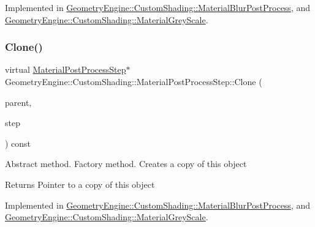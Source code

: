 Implemented in \mbox{\hyperlink{class_geometry_engine_1_1_custom_shading_1_1_material_blur_post_process_a5a6c1101b5ea4b96601db86ea36059de}{Geometry\+Engine\+::\+Custom\+Shading\+::\+Material\+Blur\+Post\+Process}}, and \mbox{\hyperlink{class_geometry_engine_1_1_custom_shading_1_1_material_grey_scale_a1b3bf70a4e714e7c456203f2dee1ffec}{Geometry\+Engine\+::\+Custom\+Shading\+::\+Material\+Grey\+Scale}}.

\mbox{\label{class_geometry_engine_1_1_custom_shading_1_1_material_post_process_step_a5fd4c17faac4fea71831868027d5a516}} 
\subsubsection{\texorpdfstring{Clone()}{Clone()}}
{\footnotesize\ttfamily virtual \mbox{\hyperlink{class_geometry_engine_1_1_custom_shading_1_1_material_post_process_step}{Material\+Post\+Process\+Step}}$\ast$ Geometry\+Engine\+::\+Custom\+Shading\+::\+Material\+Post\+Process\+Step\+::\+Clone (\begin{DoxyParamCaption}\item[{\mbox{\hyperlink{class_geometry_engine_1_1_custom_shading_1_1_material_post_process_interface}{Material\+Post\+Process\+Interface}} $\ast$}]{parent,  }\item[{\mbox{\hyperlink{namespace_geometry_engine_1_1_custom_shading_af8b09b91ca7086f4f67a5d4181f35e58}{Material\+Post\+Process\+Steps}}}]{step }\end{DoxyParamCaption}) const\hspace{0.3cm}{\ttfamily [pure virtual]}}

Abstract method. Factory method. Creates a copy of this object \begin{DoxyReturn}{Returns}
Pointer to a copy of this object 
\end{DoxyReturn}


Implemented in \mbox{\hyperlink{class_geometry_engine_1_1_custom_shading_1_1_material_blur_post_process_ac0e7b317fc9e8e8da8f66eb295adad87}{Geometry\+Engine\+::\+Custom\+Shading\+::\+Material\+Blur\+Post\+Process}}, and \mbox{\hyperlink{class_geometry_engine_1_1_custom_shading_1_1_material_grey_scale_a41197b3565f2098a3b713b5de572f2ed}{Geometry\+Engine\+::\+Custom\+Shading\+::\+Material\+Grey\+Scale}}.

